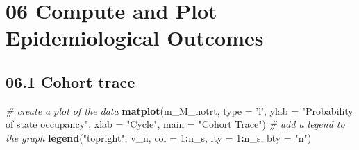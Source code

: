 \documentclass[
]{article}
\newenvironment{Shaded}{\begin{snugshade}}{\end{snugshade}}
\newcommand{\CommentTok}[1]{\textcolor[rgb]{0.56,0.35,0.01}{\textit{#1}}}
\newcommand{\ControlFlowTok}[1]{\textcolor[rgb]{0.13,0.29,0.53}{\textbf{#1}}}
\newcommand{\DataTypeTok}[1]{\textcolor[rgb]{0.13,0.29,0.53}{#1}}
\newcommand{\DecValTok}[1]{\textcolor[rgb]{0.00,0.00,0.81}{#1}}
\newcommand{\KeywordTok}[1]{\textcolor[rgb]{0.13,0.29,0.53}{\textbf{#1}}}
\newcommand{\NormalTok}[1]{#1}
\newcommand{\OperatorTok}[1]{\textcolor[rgb]{0.81,0.36,0.00}{\textbf{#1}}}
\newcommand{\StringTok}[1]{\textcolor[rgb]{0.31,0.60,0.02}{#1}}
\begin{document}
\begin{Shaded}
\end{Shaded}

\hypertarget{compute-and-plot-epidemiological-outcomes}{%
\section{06 Compute and Plot Epidemiological
Outcomes}\label{compute-and-plot-epidemiological-outcomes}}

\hypertarget{cohort-trace-1}{%
\subsection{06.1 Cohort trace}\label{cohort-trace-1}}

\begin{Shaded}
\begin{Highlighting}[]
\CommentTok{# create a plot of the data}
\KeywordTok{matplot}\NormalTok{(m_M_notrt, }\DataTypeTok{type =} \StringTok{'l'}\NormalTok{, }
        \DataTypeTok{ylab =} \StringTok{"Probability of state occupancy"}\NormalTok{,}
        \DataTypeTok{xlab =} \StringTok{"Cycle"}\NormalTok{,}
        \DataTypeTok{main =} \StringTok{"Cohort Trace"}\NormalTok{)             }
\CommentTok{# add a legend to the graph}
\KeywordTok{legend}\NormalTok{(}\StringTok{"topright"}\NormalTok{, v_n, }\DataTypeTok{col =} \DecValTok{1}\OperatorTok{:}\NormalTok{n_s, }\DataTypeTok{lty =} \DecValTok{1}\OperatorTok{:}\NormalTok{n_s, }\DataTypeTok{bty =} \StringTok{"n"}\NormalTok{) }
\end{Highlighting}
\end{Shaded}
\end{document}
